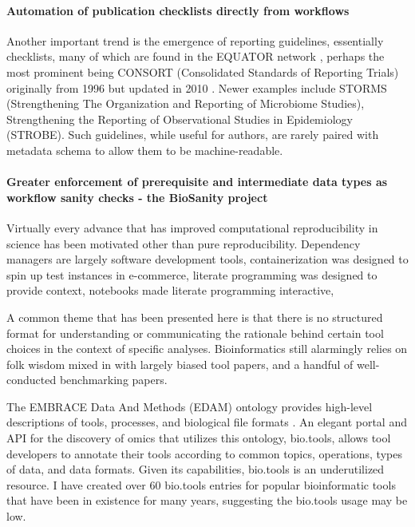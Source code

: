 \documentclass{drexelthesis}
\begin{document}
\paragraph{Automation of publication checklists directly from workflows}

Another important trend is the emergence of reporting guidelines, essentially checklists, many of which are found in the EQUATOR network \cite{Simera2010-cd}, perhaps the most prominent being CONSORT (Consolidated Standards of Reporting Trials) originally from 1996 but updated in 2010 \cite{Schulz2010-bp}. Newer examples include STORMS (Strengthening The Organization and Reporting of Microbiome Studies), Strengthening the Reporting of Observational Studies in Epidemiology (STROBE). Such guidelines, while useful for authors, are rarely paired with metadata schema to allow them to be machine-readable.

\paragraph{Greater enforcement of prerequisite and intermediate data types as workflow sanity checks - the BioSanity project}

Virtually every advance that has improved computational reproducibility in science has been motivated other than pure reproducibility. Dependency managers are largely software development tools, containerization was designed to spin up test instances in e-commerce, literate programming was designed to provide context, notebooks made literate programming interactive,

A common theme that has been presented here is that there is no structured format for understanding or communicating the rationale behind certain tool choices in the context of specific analyses. Bioinformatics still alarmingly relies on folk wisdom mixed in with largely biased tool papers, and a handful of well-conducted benchmarking papers.

The EMBRACE Data And Methods (EDAM) ontology provides high-level descriptions of tools, processes, and biological file formats \cite{Ison2013-gm}. An elegant portal and API for the discovery of omics that utilizes this ontology, bio.tools, allows tool developers to annotate their tools according to common topics, operations, types of data, and data formats. Given its capabilities, bio.tools is an underutilized resource. I have created over 60 bio.tools entries for popular bioinformatic tools that have been in existence for many years, suggesting the bio.tools usage may be low.
\end{document}
